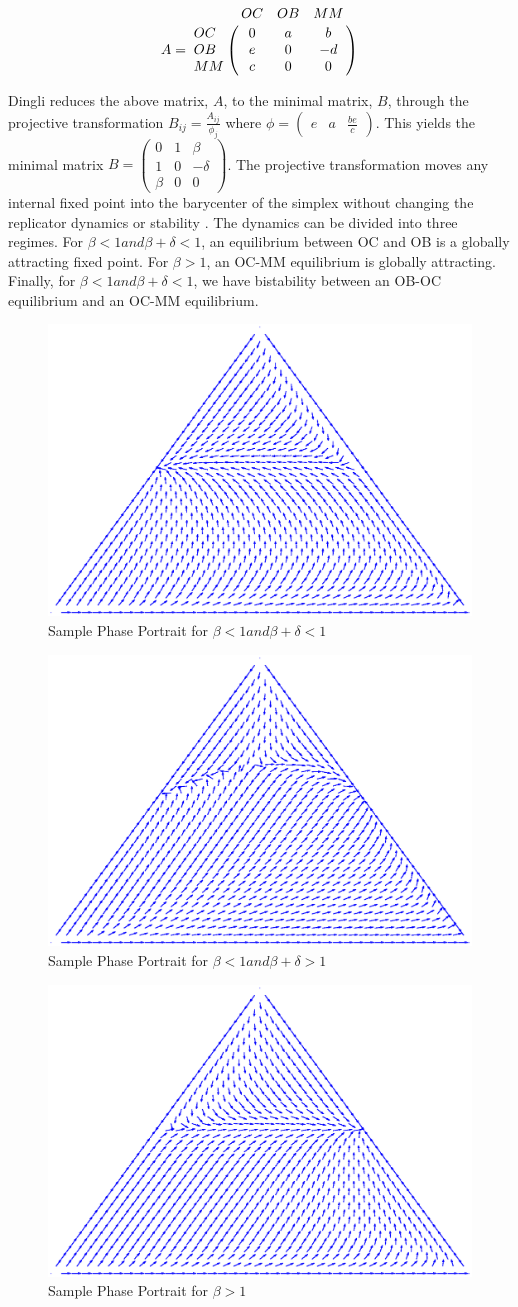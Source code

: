 \documentclass[12pt]{amsart}
\begin{document}
$$A = \bordermatrix{\text{}&OC&OB&MM\cr
                OC& 0 & a& b \cr
                OB& e  &  0 & -d \cr
                MM& c & 0 & 0 \cr
               }$$

Dingli reduces the above matrix, $A$, to the minimal matrix, $B$, through the projective transformation $B_{ij} = \frac{A_{ij}}{\phi_j}$ where 
$\phi = {\begin{pmatrix} e & a & \frac{be}{c} \end{pmatrix}}$.
This yields the minimal matrix
$B = {\begin{pmatrix}
0 & 1 & \beta \\
1 & 0 & -\delta \\
\beta & 0 & 0
\end{pmatrix}}$. 
The projective transformation moves any internal fixed point into the barycenter of the simplex without changing the replicator dynamics or stability \cite{Hofbauer1998}. The dynamics can be divided into three regimes. For $\beta < 1 and \beta + \delta < 1$, an equilibrium between OC and OB is a globally attracting fixed point. For $\beta > 1$, an OC-MM equilibrium is globally attracting. Finally, for $\beta < 1 and \beta + \delta < 1$, we have bistability between an OB-OC equilibrium and an OC-MM equilibrium. 
\begin{figure}[htb]
\caption{Sample Phase Portrait for  $\beta < 1 and \beta + \delta < 1$  }
\centering
\includegraphics[width = 1.5 in]{Diagrams/Dingli/OCOB}
\end{figure}

\begin{figure}[htb]
\caption{Sample Phase Portrait for  $\beta < 1 and \beta + \delta > 1$  }
\centering
\includegraphics[width = 1.5 in]{Diagrams/Dingli/bistable}
\end{figure}

\begin{figure}[htb]
\caption{Sample Phase Portrait for  $\beta > 1$}
\centering
\includegraphics[width = 1.5 in]{Diagrams/Dingli/OCMM}
\end{figure}
\end{document}
